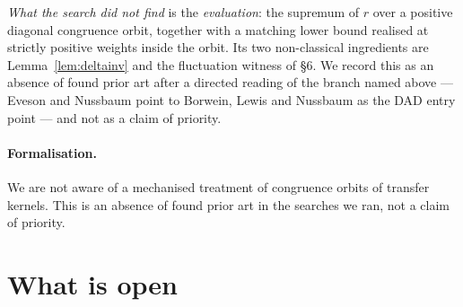\documentclass[11pt,a4paper]{article}
\theoremstyle{plain}
\theoremstyle{definition}
\begin{document}
\emph{What the search did not find} is the \emph{evaluation}: the supremum of $r$
over a positive diagonal congruence orbit, together with a matching lower bound
realised at strictly positive weights inside the orbit. Its two non-classical
ingredients are Lemma~\ref{lem:deltainv} and the fluctuation witness of \S6. We
record this as an absence of found prior art after a directed reading of the
branch named above --- Eveson and Nussbaum point to Borwein, Lewis and Nussbaum
as the DAD entry point --- and not as a claim of priority.

\paragraph{Formalisation.} We are not aware of a mechanised treatment of
congruence orbits of transfer kernels. This is an absence of found prior art in
the searches we ran, not a claim of priority.

\section{What is open}
\end{document}
